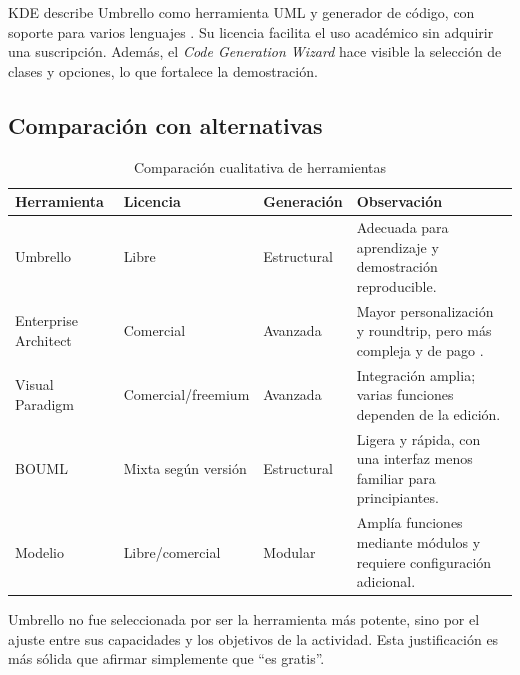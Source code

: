 KDE describe Umbrello como herramienta UML y generador de código, con soporte para varios lenguajes \cite{KDEUmbrelloApp,KDEUmbrelloCodegen}. Su licencia facilita el uso académico sin adquirir una suscripción. Además, el \textit{Code Generation Wizard} hace visible la selección de clases y opciones, lo que fortalece la demostración.

\subsection{Comparación con alternativas}
\begin{table}[H]
\centering
\caption{Comparación cualitativa de herramientas}
\begin{tabularx}{\textwidth}{L{3cm}C{2.2cm}C{2.5cm}X}
\toprule
\textbf{Herramienta} & \textbf{Licencia} & \textbf{Generación} & \textbf{Observación} \\
\midrule
Umbrello & Libre & Estructural & Adecuada para aprendizaje y demostración reproducible. \\
Enterprise Architect & Comercial & Avanzada & Mayor personalización y roundtrip, pero más compleja y de pago \cite{SparxCodeEngineering}. \\
Visual Paradigm & Comercial/freemium & Avanzada & Integración amplia; varias funciones dependen de la edición. \\
BOUML & Mixta según versión & Estructural & Ligera y rápida, con una interfaz menos familiar para principiantes. \\
Modelio & Libre/comercial & Modular & Amplía funciones mediante módulos y requiere configuración adicional. \\
\bottomrule
\end{tabularx}
\end{table}

Umbrello no fue seleccionada por ser la herramienta más potente, sino por el ajuste entre sus capacidades y los objetivos de la actividad. Esta justificación es más sólida que afirmar simplemente que ``es gratis''.

